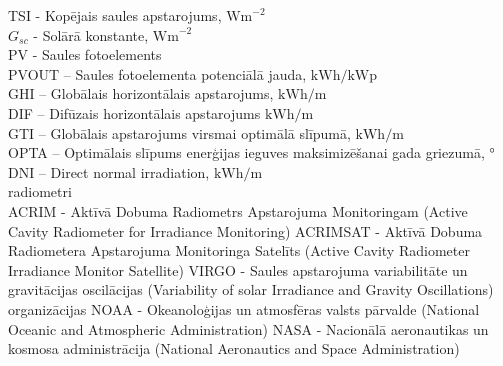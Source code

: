 \noindent TSI - Kopējais saules apstarojums, $\textrm{Wm}^{-2}$\\
$G_{sc}$ - Solārā konstante, $\textrm{Wm}^{-2}$\\
PV - Saules fotoelements\\
PVOUT – Saules fotoelementa potenciālā jauda, $\textrm{kWh/kWp}$\\ %
GHI – Globālais horizontālais apstarojums,  $\textrm{kWh/m}$\\ %
DIF – Difūzais horizontālais apstarojums  $\textrm{kWh/m}$\\ %
GTI – Globālais apstarojums virsmai optimālā slīpumā, $\textrm{kWh/m}$\\ %
OPTA – Optimālais slīpums enerģijas ieguves maksimizēšanai gada griezumā, °\\ %
DNI – Direct normal irradiation, $\textrm{kWh/m}$\\ %


radiometri\\
ACRIM - Aktīvā Dobuma Radiometrs Apstarojuma Monitoringam (Active Cavity Radiometer for Irradiance Monitoring)
ACRIMSAT - Aktīvā Dobuma Radiometera Apstarojuma Monitoringa Satelīts (Active Cavity Radiometer Irradiance Monitor Satellite) 
VIRGO - Saules apstarojuma variabilitāte un gravitācijas oscilācijas (Variability of solar Irradiance and Gravity Oscillations)
organizācijas
NOAA - Okeanoloģijas un atmosfēras valsts pārvalde (National Oceanic and Atmospheric Administration)
NASA - Nacionālā aeronautikas un kosmosa administrācija  (National Aeronautics and Space Administration)